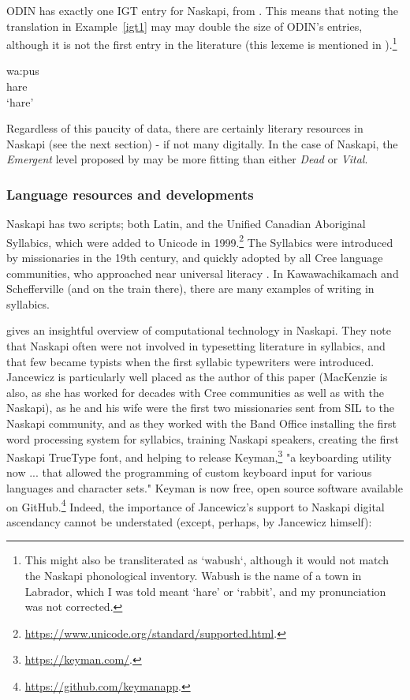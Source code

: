 ODIN has exactly one IGT entry for Naskapi, from \citep{richards2004syntax}. This means that noting the translation in Example~\ref{igt1} may may double the size of ODIN's entries, although it is not the first entry in the literature (this lexeme is mentioned in \citet{macKenzie1980towards}).\footnote{This might also be transliterated as `wabush`, although it would not match the Naskapi phonological inventory. Wabush is the name of a town in Labrador, which I was told meant `hare' or `rabbit', and my pronunciation was not corrected.}

\begin{exe}
\ex
\gll wa:pus\\
hare\\
\trans `hare'
\label{igt1}
\end{exe}

Regardless of this paucity of data, there are certainly literary resources in Naskapi (see the next section) - if not many digitally. In the case of Naskapi, the {\it Emergent} level proposed by \citet{gibson2016assessing} may be more fitting than either {\it Dead} or {\it Vital}.

\subsubsection{Language resources and developments}
Naskapi has two scripts; both Latin, and the Unified Canadian Aboriginal Syllabics, which were added to Unicode in 1999.\footnote{\href{https://www.unicode.org/standard/supported.html}{https://www.unicode.org/standard/supported.html}. } The Syllabics were introduced by missionaries in the 19th century, and quickly adopted by all Cree language communities, who approached near universal literacy \citep{bennett1991cree}. In Kawawachikamach and Schefferville (and on the train there), there are many examples of writing in syllabics.

\citet{jancewicz2002applied} gives an insightful overview of computational technology in Naskapi. They note that Naskapi often were not involved in typesetting literature in syllabics, and that few became typists when the first syllabic typewriters were introduced. Jancewicz is particularly well placed as the author of this paper (MacKenzie is also, as she has worked for decades with Cree communities as well as with the Naskapi), as he and his wife were the first two missionaries sent from SIL to the Naskapi community, and as they worked with the Band Office installing the first word processing system for syllabics, training Naskapi speakers, creating the first Naskapi TrueType font, and helping to release Keyman,\footnote{\href{https://keyman.com/}{https://keyman.com/}. } "a keyboarding utility now ... that allowed the programming of custom keyboard input for various languages and character sets." \citep[85]{jancewicz2002applied} Keyman is now free, open source software available on GitHub.\footnote{\href{https://github.com/keymanapp}{https://github.com/keymanapp}. } Indeed, the importance of Jancewicz's support to Naskapi digital ascendancy cannot be understated (except, perhaps, by Jancewicz himself):


